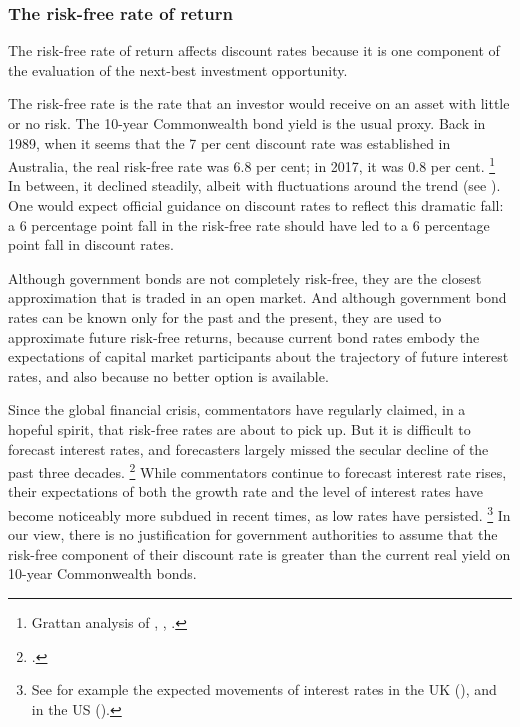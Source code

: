 \documentclass{grattan}
\begin{document}
\subsubsection{The risk-free rate of return}
The risk-free rate of return affects discount rates because it is one component of the evaluation of the next-best investment opportunity. 

The risk-free rate is the rate that an investor would receive on an asset with little or no risk. The 10-year Commonwealth bond yield is the usual proxy. Back in 1989, when it seems that the 7 per cent discount rate was established in Australia, the real risk-free rate was 6.8 per cent; in 2017, it was 0.8 per cent.%
    \footnote{Grattan analysis of \textcite{RBA-2018-CPI-table}, \textcite{RBA-2018-Government-bonds-monthly}, \textcite{RBA-2013-Government-bonds-monthly-historical}.}
In between, it declined steadily, albeit with fluctuations around the trend (see ).
One would expect official guidance on discount rates to reflect this dramatic fall: a 6 percentage point fall in the risk-free rate should have led to a 6 percentage point fall in discount rates.

Although government bonds are not completely risk-free, they are the closest approximation that is traded in an open market. And although government bond rates can be known only for the past and the present, they are used to approximate future risk-free returns, because current bond rates embody the expectations of capital market participants about the trajectory of future interest rates, and also because no better option is available.

Since the global financial crisis, commentators have regularly claimed, in a hopeful spirit, that risk-free rates are about to pick up. But it is difficult to forecast interest rates, and forecasters largely missed the secular decline of the past three decades.%
    \footcite[][12]{CEA-July-2015-Long-term-interest-rates-a-survey}
While commentators continue to forecast interest rate rises, their expectations of both the growth rate and the level of interest rates have become noticeably more subdued in recent times, as low rates have persisted.%
    \footnote{See for example the expected movements of interest rates in the UK (\textcite{Economic-Research-Council-chart-of-fwd-interest-rates}), and in the US (\textcite[][Chart 7 on page 22]{CEA-July-2015-Long-term-interest-rates-a-survey}).}
In our view, there is no justification for government authorities to assume that the risk-free component of their discount rate is greater than the current real yield on 10-year Commonwealth bonds.
\end{document}
